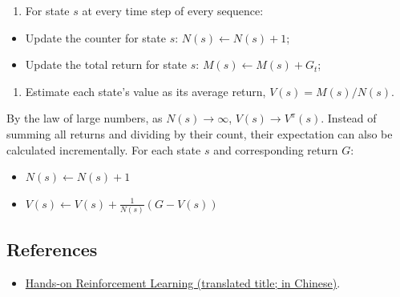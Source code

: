 \begin{enumerate}
\def\labelenumi{(\arabic{enumi})}
\setcounter{enumi}{1}
\tightlist
\item
{}
  For state \(s\) at every time step of every sequence:
\end{enumerate}

\begin{itemize}
\tightlist
\item
  Update the counter for state \(s\): \(N(s)\leftarrow N(s)+1\);
\item
  Update the total return for state \(s\): \(M(s)\leftarrow M(s)+G_t\);
\end{itemize}

\begin{enumerate}
\def\labelenumi{(\arabic{enumi})}
\setcounter{enumi}{2}
\tightlist
\item
  Estimate each state's value as its average return, \(V(s)=M(s)/N(s)\).
\end{enumerate}

By the law of large numbers, as \(N(s)\to\infty\), \(V(s)\to V^\pi(s)\). Instead of summing all returns and dividing by their count, their expectation can also be calculated incrementally. For each state \(s\) and corresponding return \(G\):

\begin{itemize}
\tightlist
\item
  \(N(s)\leftarrow N(s)+1\)
\item
  \(V(s)\leftarrow V(s)+\frac{1}{N(s)}(G-V(s))\)
\end{itemize}

\FloatBarrier
{}
\hypertarget{references-46}{%
\subsection{References}\label{references-46}}

\vspace{0.25em}
\begin{itemize}
\tightlist
\item
  \href{https://hrl.boyuai.com/}{Hands-on Reinforcement Learning (translated title; in Chinese)}.
\end{itemize}

\clearpage

